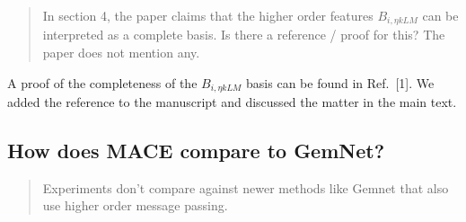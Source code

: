 \documentclass{article}
\begin{document}

\begin{quote}
In section 4, the paper claims that the higher order features $B_{i,\eta k L M}$ can be interpreted as a complete basis. Is there a reference / proof for this? The paper does not mention any.
\end{quote}

A proof of the completeness of the $B_{i,\eta k L M}$ basis can be found in Ref.~[1].
We added the reference to the manuscript and discussed the matter in the main text.

\subsection*{How does MACE compare to GemNet?} 

\begin{quote}
Experiments don't compare against newer methods like Gemnet that also use higher order message passing.
\end{quote}
\end{document}
